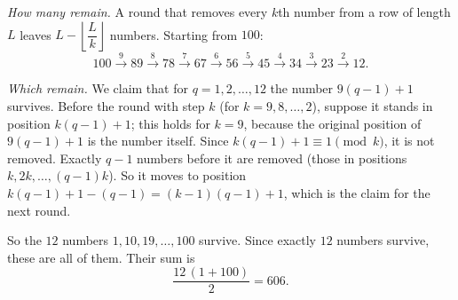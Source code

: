 \emph{How many remain.} A round that removes every $k$th number from a row of length $L$ leaves $L-\left\lfloor\dfrac Lk\right\rfloor$ numbers. Starting from $100$:
\[100\xrightarrow{9}89\xrightarrow{8}78\xrightarrow{7}67\xrightarrow{6}56\xrightarrow{5}45\xrightarrow{4}34\xrightarrow{3}23\xrightarrow{2}12.\]

\emph{Which remain.} We claim that for $q=1,2,\dots,12$ the number $9(q-1)+1$ survives. Before the round with step $k$ (for $k=9,8,\dots,2$), suppose it stands in position $k(q-1)+1$; this holds for $k=9$, because the original position of $9(q-1)+1$ is the number itself. Since $k(q-1)+1\equiv1\pmod k$, it is not removed. Exactly $q-1$ numbers before it are removed (those in positions $k,2k,\dots,(q-1)k$). So it moves to position $k(q-1)+1-(q-1)=(k-1)(q-1)+1$, which is the claim for the next round.

So the $12$ numbers $1,10,19,\dots,100$ survive. Since exactly $12$ numbers survive, these are all of them. Their sum is
\[\dfrac{12\,(1+100)}{2}=\boxed{606}.\]
